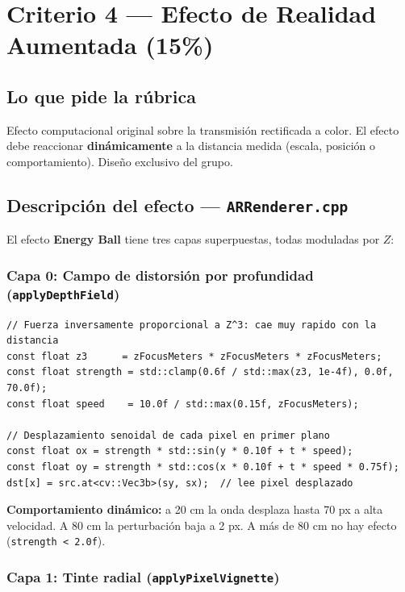 \documentclass[11pt,a4paper]{article}
\begin{document}
\section{Criterio 4 — Efecto de Realidad Aumentada (15\%)}

\subsection*{Lo que pide la rúbrica}
Efecto computacional original sobre la transmisión rectificada a color.
El efecto debe reaccionar \textbf{dinámicamente} a la distancia medida (escala, posición
o comportamiento). Diseño exclusivo del grupo.

\subsection*{Descripción del efecto — \texttt{ARRenderer.cpp}}

El efecto \textbf{Energy Ball} tiene tres capas superpuestas, todas moduladas por $Z$:

\subsubsection*{Capa 0: Campo de distorsión por profundidad (\texttt{applyDepthField})}

\begin{lstlisting}[caption={Distorsión de onda reactiva a la distancia}]
// Fuerza inversamente proporcional a Z^3: cae muy rapido con la distancia
const float z3      = zFocusMeters * zFocusMeters * zFocusMeters;
const float strength = std::clamp(0.6f / std::max(z3, 1e-4f), 0.0f, 70.0f);
const float speed    = 10.0f / std::max(0.15f, zFocusMeters);

// Desplazamiento senoidal de cada pixel en primer plano
const float ox = strength * std::sin(y * 0.10f + t * speed);
const float oy = strength * std::cos(x * 0.10f + t * speed * 0.75f);
dst[x] = src.at<cv::Vec3b>(sy, sx);  // lee pixel desplazado
\end{lstlisting}

\noindent\textbf{Comportamiento dinámico:} a 20 cm la onda desplaza hasta 70 px a alta velocidad.
A 80 cm la perturbación baja a 2 px. A más de 80 cm no hay efecto (\texttt{strength < 2.0f}).

\subsubsection*{Capa 1: Tinte radial (\texttt{applyPixelVignette})}
\end{document}
